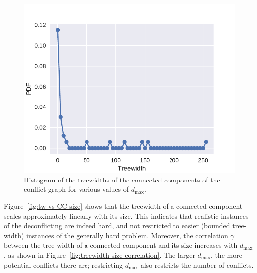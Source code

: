 \begin{figure}[h]
\includegraphics[width=\columnwidth]{pics/instances/treewidth_histogram.pdf}
\caption[Histogram of connected component treewidths]{Histogram of the treewidths of the connected components of the conflict graph for various values of $d_{\max}$.}
\label{fig:hist-tws}
\end{figure}

Figure~\ref{fig:tw-vs-CC-size} shows that the treewidth of a connected component scales approximately linearly with its size.
This indicates that realistic instances of the deconflicting are indeed hard, and not restricted to easier (bounded tree-width) instances of the generally hard problem.
Moreover, the correlation $\gamma$ between the tree-width of a connected component and its size increases with $d_{\max}$, as shown in Figure~\ref{fig:treewidth-size-correlation}.
The larger $d_{\max}$, the more potential conflicts there are;
restricting $d_{\max}$ also restricts the number of conflicts.

